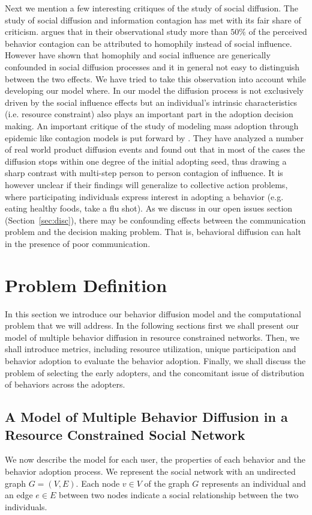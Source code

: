 \documentclass[letterpaper]{article}
\theoremstyle{plain} 		\newtheorem{thm}{Theorem}[section]
\theoremstyle{definition} 	\newtheorem{defn}[thm]{Definition}
\theoremstyle{remark}		\newtheorem{rem}{Remark}
\begin{document}
Next we mention a few interesting critiques of the study of social diffusion. The study of social diffusion and information contagion has met with its fair share of criticism. \cite{Aral09} argues that in their observational study more than $50\%$ of the perceived behavior contagion can be attributed to homophily instead of social influence. However \cite{shalizi11} have shown that homophily and social influence are generically confounded in social diffusion processes and it in general not easy to distinguish between the two effects. We have tried to take this observation into account while developing our model where. In our model the diffusion process is not exclusively driven by the social influence effects but an individual's intrinsic characteristics (i.e. resource constraint) also plays an important part in the adoption decision making.  An important critique of the study of modeling mass adoption through epidemic like contagion models is put forward by \cite{Goel12}. They have analyzed a number of real world product diffusion events and found out that in most of the cases the diffusion stops within one degree of the initial adopting seed, thus drawing a sharp contrast with multi-step person to person contagion of influence. It is however unclear if their findings will generalize to collective action problems, where participating individuals express interest in adopting a behavior (e.g. eating healthy foods, take a flu shot). As we discuss in our open issues section (Section~\ref{sec:disc}), there may be confounding effects between the communication problem and the decision making problem. That is, behavioral diffusion can halt in the presence of poor communication.

\section{Problem Definition}\label{sec:problem}
In this section we introduce our behavior diffusion model and the computational problem that we will address. In the following sections first we shall present our model of multiple behavior diffusion in resource constrained networks. Then, we shall introduce metrics, including resource utilization, unique participation and behavior adoption to evaluate the behavior adoption.  Finally, we shall discuss the problem of selecting the early adopters, and the concomitant issue of distribution of behaviors across the adopters.

\subsection{A Model of Multiple Behavior Diffusion in a Resource Constrained Social Network} \label{sub-sec:model}
We now describe the model for each user, the properties of each behavior and the behavior adoption process. We represent the social network with an undirected graph $G=(V,E)$. Each node $v \in V$ of the graph $G$ represents an individual and an edge $e \in E$ between two nodes indicate a social relationship between the two individuals. 
\end{document}
